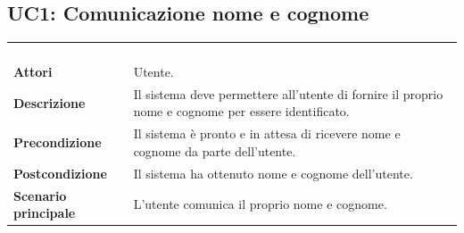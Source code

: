 \subsection{UC1: Comunicazione nome e cognome}
\label{UC1}
\begin{longtable}{l|p{10cm}}
\rowcolor[gray]{0.8} \multicolumn{2}{c}{} \\
\rowcolor[gray]{0.8} \multicolumn{2}{c}{\textbf{UC1 - Comunicazione nome e cognome}} \\
\rowcolor[gray]{0.8} \multicolumn{2}{c}{} \\
\hline
&\\
\textbf{Attori} & Utente.\\[7pt]
\textbf{Descrizione} & Il sistema deve permettere all'utente di fornire il proprio nome e cognome per essere identificato.\\[7pt]
\textbf{Precondizione} & Il sistema è pronto e in attesa di ricevere nome e cognome da parte dell'utente.\\[7pt]
\textbf{Postcondizione} & Il sistema ha ottenuto nome e cognome dell'utente.\\[7pt]
\textbf{Scenario principale} &L'utente comunica il proprio nome e cognome. \\[7pt]\hline
\end{longtable}

